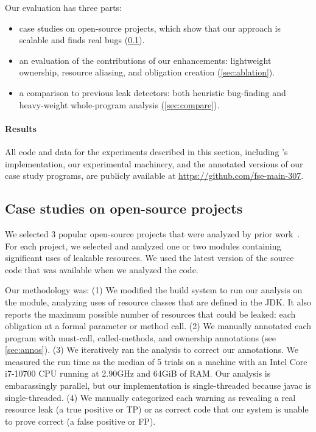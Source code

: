 Our evaluation has three parts:
\begin{itemize}
\item case studies on open-source projects, which show that our approach
  is scalable and finds real bugs (\cref{sec:case-studies}).
\item an evaluation of the contributions of our enhancements:
  lightweight ownership, %
  resource aliasing, %
  and obligation creation %
  (\cref{sec:ablation}).
\item a comparison to previous leak detectors:  both heuristic bug-finding
  and heavy-weight whole-program
  analysis (\cref{sec:compare}).
\end{itemize}
\noindent
\paragraph{Results} All code and data for the experiments described
in this section, including \Tool's implementation, our experimental
machinery, and the annotated versions of our case study programs,
are publicly available at \url{https://github.com/fse-main-307}.

\subsection{Case studies on open-source projects}
\label{sec:case-studies}

We selected 3 popular open-source projects that were analyzed by prior work~\cite{zuo2019grapple}.
For each project, we selected and analyzed one or two modules
containing significant uses of leakable resources. We used
the latest version of the source code that was available
when we analyzed the code.

Our methodology was:
(1)
We modified the
build system to run our analysis on the module, analyzing uses of resource
classes that are defined in the JDK\@.
It also reports the maximum possible number of resources that could be
leaked:  each obligation at a formal parameter or method call.
(2) We manually
annotated each program with must-call, called-methods, and ownership
annotations (see \cref{sec:annos}).
(3) We iteratively ran the analysis to correct our annotations.
We measured the run time
as the median of 5 trials on
a machine with an Intel Core i7-10700 CPU running at 2.90GHz and 64GiB of RAM\@.
Our analysis is embarassingly parallel, but our implementation is
single-threaded because javac is single-threaded.
(4) We manually categorized each warning as revealing a
real resource leak (a true positive or TP) or as correct code that our
system is unable to prove correct (a false positive or FP\@).

